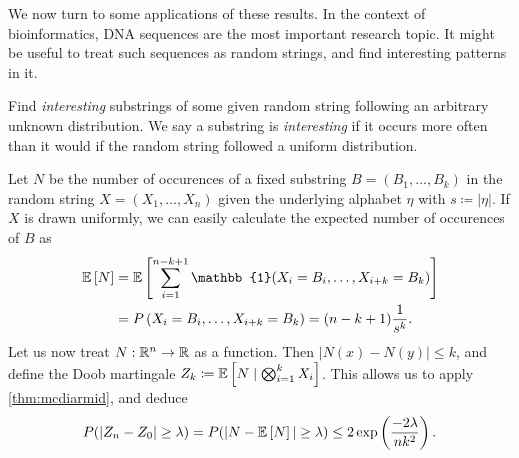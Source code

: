 We now turn to some applications of these results.
In the context of bioinformatics, DNA sequences are the most important research topic.
It might be useful to treat such sequences as random strings, and find interesting patterns in it.
\begin{problem}
Find \emph{interesting} substrings of some given random string following an arbitrary unknown distribution.
We say a substring is \emph{interesting} if it occurs more often than it would if the random string followed a uniform distribution.
\end{problem}
Let $N$ be the number of occurences of a fixed substring $B=(B_1, \dots, B_k)$ in the random string $X = (X_1, \dots, X_n)$ given the underlying alphabet $\eta$ with $s \coloneqq |\eta|$.
If $X$ is drawn uniformly, we can easily calculate the expected number of occurences of $B$ as
\begin{align}
    \expect{N} & = \expect{\sum_{i=1}^{n-k+1} \mathbb{1}(X_i = B_i, \dots, X_{i+k} = B_k)} \\
               & = P\left(X_i = B_i, \dots, X_{i+k} = B_k\right) = (n-k+1)\frac{1}{s^k}.
\end{align}
Let us now treat $N : \mathbb{R}^n \rightarrow \mathbb{R}$ as a function.
Then $|N(x) - N(y)| \leq k$, and define the Doob martingale $Z_k \coloneqq \mathbb{E}\left[N \mid \bigotimes_{i=1}^k X_i\right]$.
This allows us to apply \autoref{thm:mcdiarmid}, and deduce
\begin{align}
    P(|Z_n - Z_0| \geq \lambda) = P(|N - \mathbb{E}\left[N\right]| \geq \lambda) \leq 2\exp\left(\frac{-2\lambda}{nk^2}\right).
\end{align}
